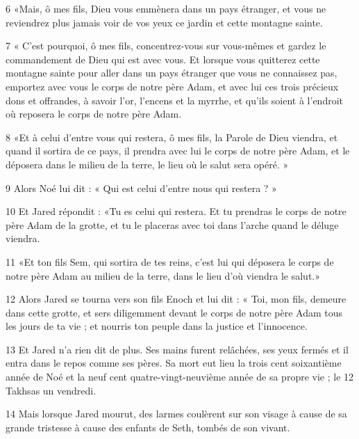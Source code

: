 \par 6 «Mais, ô mes fils, Dieu vous emmènera dans un pays étranger, et vous ne reviendrez plus jamais voir de vos yeux ce jardin et cette montagne sainte.

\par 7 « C'est pourquoi, ô mes fils, concentrez-vous sur vous-mêmes et gardez le commandement de Dieu qui est avec vous. Et lorsque vous quitterez cette montagne sainte pour aller dans un pays étranger que vous ne connaissez pas, emportez avec vous le corps de notre père Adam, et avec lui ces trois précieux dons et offrandes, à savoir l'or, l'encens et la myrrhe, et qu'ils soient à l'endroit où reposera le corps de notre père Adam.

\par 8 «Et à celui d'entre vous qui restera, ô mes fils, la Parole de Dieu viendra, et quand il sortira de ce pays, il prendra avec lui le corps de notre père Adam, et le déposera dans le milieu de la terre, le lieu où le salut sera opéré. »

\par 9 Alors Noé lui dit : « Qui est celui d'entre nous qui restera ? »

\par 10 Et Jared répondit : «Tu es celui qui restera. Et tu prendras le corps de notre père Adam de la grotte, et tu le placeras avec toi dans l'arche quand le déluge viendra.

\par 11 «Et ton fils Sem, qui sortira de tes reins, c'est lui qui déposera le corps de notre père Adam au milieu de la terre, dans le lieu d'où viendra le salut.»

\par 12 Alors Jared se tourna vers son fils Enoch et lui dit : « Toi, mon fils, demeure dans cette grotte, et sers diligemment devant le corps de notre père Adam tous les jours de ta vie ; et nourris ton peuple dans la justice et l’innocence.

\par 13 Et Jared n'a rien dit de plus. Ses mains furent relâchées, ses yeux fermés et il entra dans le repos comme ses pères. Sa mort eut lieu la trois cent soixantième année de Noé et la neuf cent quatre-vingt-neuvième année de sa propre vie ; le 12 Takhsas un vendredi.

\par 14 Mais lorsque Jared mourut, des larmes coulèrent sur son visage à cause de sa grande tristesse à cause des enfants de Seth, tombés de son vivant.


